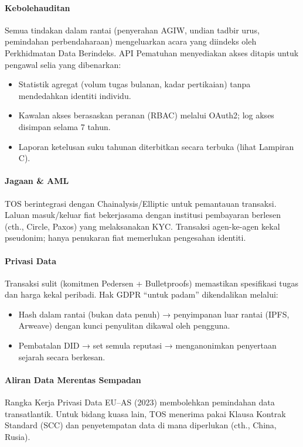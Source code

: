 \documentclass[11pt]{article}
\begin{document}
\paragraph{Kebolehauditan}
Semua tindakan dalam rantai (penyerahan AGIW, undian tadbir urus, pemindahan perbendaharaan) mengeluarkan acara yang diindeks oleh Perkhidmatan Data Berindeks. API Pematuhan menyediakan akses ditapis untuk pengawal selia yang dibenarkan:
\begin{itemize}[noitemsep]
  \item Statistik agregat (volum tugas bulanan, kadar pertikaian) tanpa mendedahkan identiti individu.
  \item Kawalan akses berasaskan peranan (RBAC) melalui OAuth2; log akses disimpan selama 7 tahun.
  \item Laporan ketelusan suku tahunan diterbitkan secara terbuka (lihat Lampiran C).
\end{itemize}

\paragraph{Jagaan \& AML}
TOS berintegrasi dengan Chainalysis/Elliptic untuk pemantauan transaksi. Laluan masuk/keluar fiat bekerjasama dengan institusi pembayaran berlesen (cth., Circle, Paxos) yang melaksanakan KYC. Transaksi agen-ke-agen kekal pseudonim; hanya penukaran fiat memerlukan pengesahan identiti.

\paragraph{Privasi Data}
Transaksi sulit (komitmen Pedersen + Bulletproofs) memastikan spesifikasi tugas dan harga kekal peribadi. Hak GDPR ``untuk padam'' dikendalikan melalui:
\begin{itemize}[noitemsep]
  \item Hash dalam rantai (bukan data penuh) → penyimpanan luar rantai (IPFS, Arweave) dengan kunci penyulitan dikawal oleh pengguna.
  \item Pembatalan DID → set semula reputasi → menganonimkan penyertaan sejarah secara berkesan.
\end{itemize}

\paragraph{Aliran Data Merentas Sempadan}
Rangka Kerja Privasi Data EU--AS (2023) membolehkan pemindahan data transatlantik. Untuk bidang kuasa lain, TOS menerima pakai Klausa Kontrak Standard (SCC) dan penyetempatan data di mana diperlukan (cth., China, Rusia).
\end{document}
